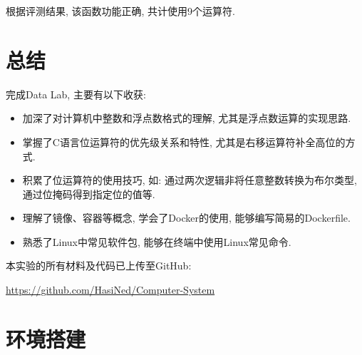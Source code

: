 根据评测结果, 该函数功能正确, 共计使用9个运算符.

\section{总结}

完成Data Lab, 主要有以下收获:

\begin{itemize}
    \item 加深了对计算机中整数和浮点数格式的理解, 尤其是浮点数运算的实现思路.
    \item 掌握了C语言位运算符的优先级关系和特性, 尤其是右移运算符补全高位的方式.
    \item 积累了位运算符的使用技巧, 如: 通过两次逻辑非将任意整数转换为布尔类型, 通过位掩码得到指定位的值等.
    \item 理解了镜像、容器等概念, 学会了Docker的使用, 能够编写简易的Dockerfile.
    \item 熟悉了Linux中常见软件包, 能够在终端中使用Linux常见命令.
\end{itemize}

本实验的所有材料及代码已上传至GitHub:

\url{https://github.com/HasiNed/Computer-System}

\setupappendix

\clearpage
\section{环境搭建}\label{env}

